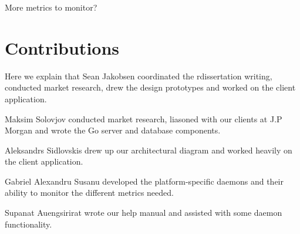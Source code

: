 \documentclass{l3proj}
\begin{document}
More metrics to monitor?


\section{Contributions}

Here we explain that Sean Jakobsen coordinated the rdissertation writing, conducted market research, drew the design prototypes and worked on the client application. 

Maksim Solovjov conducted market research, liasoned with our clients at J.P Morgan and wrote the Go server and database components.

Aleksandrs Sidlovskis drew up our architectural diagram and worked heavily on the client application.

Gabriel Alexandru Susanu developed the platform-specific daemons and their ability to monitor the different metrics needed.

Supanat Auengsirirat wrote our help manual and assisted with some daemon functionality.





\end{document}
